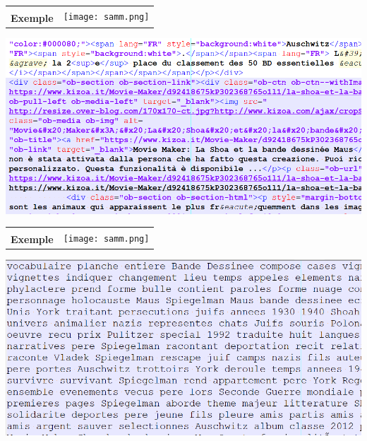 \documentclass[12pt]{beamer}
\begin{document}
\begin{frame}
\begin{tabular}{b{7cm}l}
& \multirow{2}{*}{\texttt{[image: samm.png]}}\\ {\large \textbf{Exemple}}& 
\end{tabular}

\vspace{0.5cm}

\includegraphics[scale=0.25]{code2-brut.png}

\end{frame}

\begin{frame}
\begin{tabular}{b{7cm}l}
& \multirow{2}{*}{\texttt{[image: samm.png]}}\\ {\large \textbf{Exemple}}& 
\end{tabular}

\vspace{0.5cm}

\includegraphics[scale=0.25]{code3-sac.png}

\end{frame}
\end{document}
